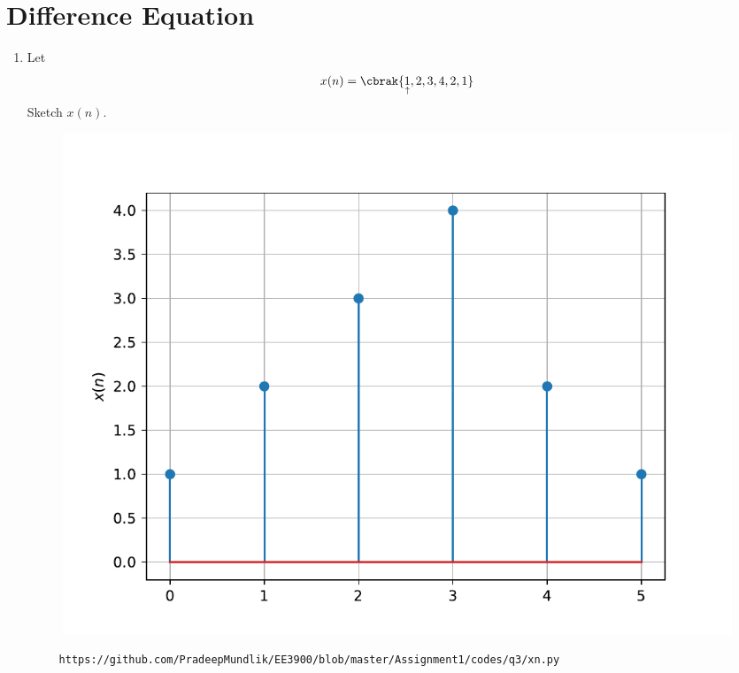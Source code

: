 \documentclass[journal,12pt,twocolumn]{IEEEtran}
\renewcommand\thesection{\arabic{section}}
\begin{document}
\section{Difference Equation}
\begin{enumerate}[label=\thesection.\arabic*,ref=\thesection.\theenumi]
\item Let
\begin{equation}
x(n) = \cbrak{\underset{\uparrow}{1},2,3,4,2,1}
\label{eq:xn}
\end{equation}
Sketch $x(n)$. \\
\solution 

\begin{figure}[!ht]
\begin{center}
\includegraphics[width=\columnwidth]{figs/q3/xn.pdf}
\end{center}
\label{fig:xn}	
\end{figure}
\begin{lstlisting}
     https://github.com/PradeepMundlik/EE3900/blob/master/Assignment1/codes/q3/xn.py
\end{lstlisting}


\end{enumerate}
\end{document}
